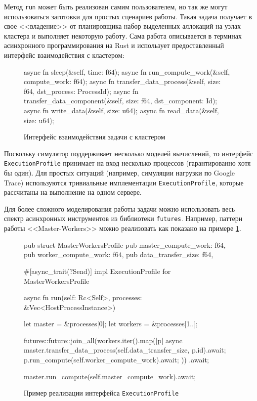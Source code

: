 Метод \texttt{run} может быть реализован самим пользователем, но так же могут использоваться заготовки для простых сценариев работы. Такая задача получает в свое <<владение>> от планировщика набор выделенных аллокаций на узлах кластера и выполняет некоторую работу. Сама работа описывается в терминах асинхронного программирования на Rust и использует предоставленный интерфейс взаимодействия с кластером: 
\begin{figure}[h!]
    \footnotesize
\begin{rustcode}
async fn sleep(&self, time: f64);
async fn run_compute_work(&self, compute_work: f64);
async fn transfer_data_process(&self, size: f64, dst_process: ProcessId);
async fn transfer_data_component(&self, size: f64, dst_component: Id);
async fn write_data(&self, size: u64);
async fn read_data(&self, size: u64);
\end{rustcode}
\caption{Интерфейс взаимодействия задачи с кластером}
\end{figure}

Поскольку симулятор поддерживает несколько моделей вычислений, то интерфейс \\ \texttt{ExecutionProfile} принимает на вход несколько процессов (гарантированно хотя бы один). Для простых ситуаций (например, симуляции нагрузки по Google Trace) используются тривиальные имплементации \texttt{ExecutionProfile}, которые рассчитаны на выполнение на одном сервере. 

Для более сложного моделирования работы задачи можно использовать весь спектр асинхронных инструментов из библиотеки \texttt{futures}\cite{rust-futures}. Например, паттерн работы <<Master-Workers>> можно реализовать как показано на примере \ref{fig:execution-profile-impl}.

\begin{figure}[h!]
    \footnotesize 
    \begin{rustcode}
pub struct MasterWorkersProfile {
  pub master_compute_work: f64,
  pub worker_compute_work: f64,
  pub data_transfer_size: f64,
}

#[async_trait(?Send)]
impl ExecutionProfile for MasterWorkersProfile {
  async fn run(self: Rc<Self>, processes: &Vec<HostProcessInstance>) {
    let master = &processes[0];
    let workers = &processes[1..];
    
    futures::future::join_all(workers.iter().map(|p| async {
      master.transfer_data_process(self.data_transfer_size, p.id).await;
      p.run_compute(self.worker_compute_work).await;
    }))
    .await;
    
    master.run_compute(self.master_compute_work).await;
  }
}
    \end{rustcode}
    \caption{Пример реализации интерфейса \texttt{ExecutionProfile}}
    \label{fig:execution-profile-impl}
\end{figure}

